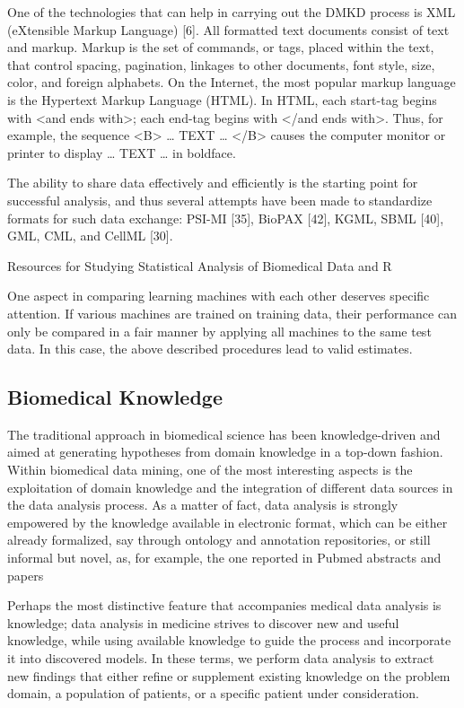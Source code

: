 \documentclass[10pt,a4paper]{article}
\begin{document}
	One of the technologies that can help in carrying out the DMKD process is XML (eXtensible Markup Language) [6]. All formatted text documents consist of text and markup. Markup is the set of commands, or tags, placed within the text, that control spacing, pagination, linkages to other documents, font style, size, color, and foreign alphabets. On the Internet, the most popular markup language is the Hypertext Markup Language (HTML). In HTML, each start-tag begins with <and ends with>; each end-tag begins with </and ends with>. Thus, for example, the sequence <B> … TEXT … </B> causes the computer monitor or printer to display … TEXT … in boldface. \cite{CIOS20021}
	
	The ability to share data effectively and efficiently is the starting point for successful
	analysis, and thus several attempts have been made to standardize formats for such
	data exchange: PSI-MI [35], BioPAX [42], KGML, SBML [40], GML, CML, and
	CellML [30]. \cite{Otasek2014}
	
	Resources for Studying Statistical Analysis
	of Biomedical Data and R \cite{Kobayashi2014}
	
	One aspect in comparing learning machines
	with each other deserves specific attention.
	If various machines are trained on
	training data, their performance can only
	be compared in a fair manner by applying
	all machines to the same test data. In this
	case, the above described procedures lead
	to valid estimates. \cite{bellazzi2011data}
	
	\subsection{Biomedical Knowledge}
	
	The traditional approach in biomedical science has been knowledge-driven and aimed at generating hypotheses from domain knowledge in a top-down fashion. Within biomedical data mining, one of the most
	interesting aspects is the exploitation of domain knowledge and the integration of different data sources in the data analysis process. As a matter of fact, data analysis is strongly empowered by the knowledge available in electronic format, which can be either already formalized, say through ontology and annotation repositories, or still informal but novel, as, for example, the one reported in Pubmed abstracts and papers\cite{bellazzi2011data}
	
	Perhaps the most distinctive feature that accompanies medical data analysis is knowledge; data analysis in medicine strives to discover new and useful knowledge, while using available knowledge to guide the process and incorporate it into discovered models. In these terms, we perform data analysis to extract new findings that either refine or supplement existing knowledge on the problem domain, a population of patients, or a specific patient under consideration. \cite{zupan2006knowledge}
	
\end{document}
